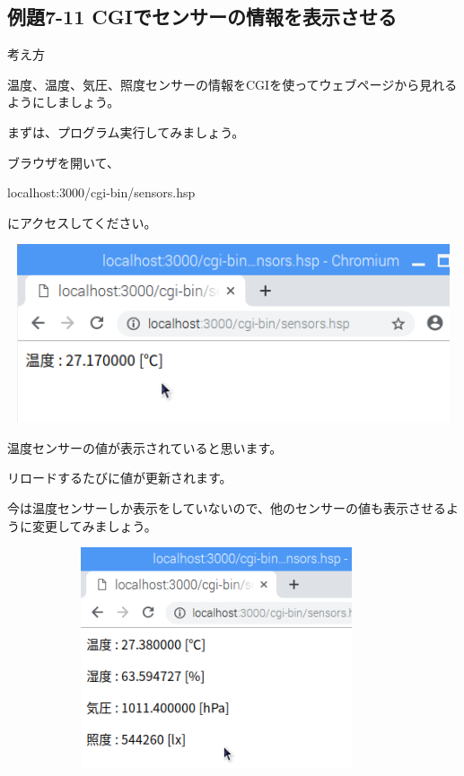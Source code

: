 \documentclass[a4paper,12pt,dvipdfmx]{jarticle}
\begin{document}
\clearpage\subsection*{\rmfamily 例題7-11
CGIでセンサーの情報を表示させる}
考え方

温度、温度、気圧、照度センサーの情報をCGIを使ってウェブページから見れるようにしましょう。


\bigskip

まずは、プログラム実行してみましょう。

ブラウザを開いて、

localhost:3000/cgi-bin/sensors.hsp

にアクセスしてください。


%


\centering
\includegraphics[width=17.0cm,height=5.262cm]{ome7-img058.png}
\flushleft


\bigskip

温度センサーの値が表示されていると思います。

リロードするたびに値が更新されます。

今は温度センサーしか表示をしていないので、他のセンサーの値も表示させるように変更してみましょう。

%


\centering
\includegraphics[width=12.34cm,height=6.541cm]{ome7-img059.png}
\flushleft
\end{document}
